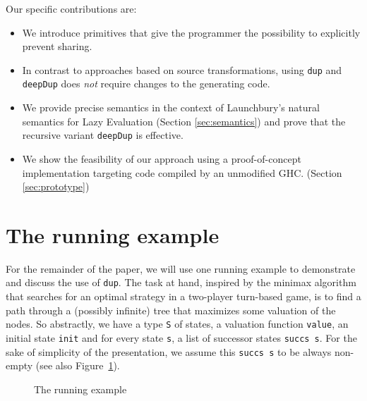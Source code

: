 \documentclass[preprint]{sigplanconf}
\theoremstyle{nonumberplain}
\newcommand{\li}{\lstinline[style=Haskell]}
\begin{document}
Our specific contributions are:
\begin{itemize}
\item We introduce primitives that give the programmer the possibility to explicitly prevent sharing.
\item In contrast to approaches based on source transformations, using \li-dup- and \li-deepDup- does \emph{not} require changes to the generating code.
\item We provide precise semantics in the context of Launchbury’s natural semantics for Lazy Evaluation (Section \ref{sec:semantics}) and prove that the recursive variant \li-deepDup- is effective.
\item We show the feasibility of our approach using a proof-of-concept implementation targeting code compiled by an unmodified GHC. (Section \ref{sec:prototype})
\end{itemize}

\section{The running example}
\label{sec:example}

For the remainder of the paper, we will use one running example to demonstrate and discuss the use of \li-dup-. The task at hand, inspired by the minimax algorithm that searches for an optimal strategy in a two-player turn-based game, is to find a path through a (possibly infinite) tree that maximizes some valuation of the nodes. So abstractly, we have a type \li-S- of states, a valuation function \li-value-, an initial state \li-init- and for every state \li-s-, a list of successor states \li-succs s-. For the sake of simplicity of the presentation, we assume this \li-succs s- to be always non-empty (see also Figure~\ref{fig:ex}).

\begin{figure}
\caption{The running example}
\label{fig:ex}
\end{figure}
\end{document}
